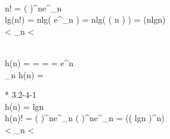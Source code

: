 \\
\because n! = \left (  \right )^{n}e^{\alpha _{n}} \\
\therefore lg(n!) = nlg\left ( \cdot {} \cdot e^{\alpha_{n}}  \right) = nlg\left ( \Theta \left ( n \right ) \right ) = \Theta (nlgn) \\
 < \alpha _{n} < 



\\
h(n) =  =  =  = e^{n} \\
\lim_{n \to \infty }h(n) = \infty

* 3.2-4-1
\\
h(n) = \left \lceil lgn \right \rceil \\
h(n)! = \left (  \right )^{n}e^{\alpha _{n}} \geq {}\left (  \right )^{n}e^{\alpha_{n}} = \Theta (\left ( lgn \right )^{n}) \\
 < \alpha _{n} < 
